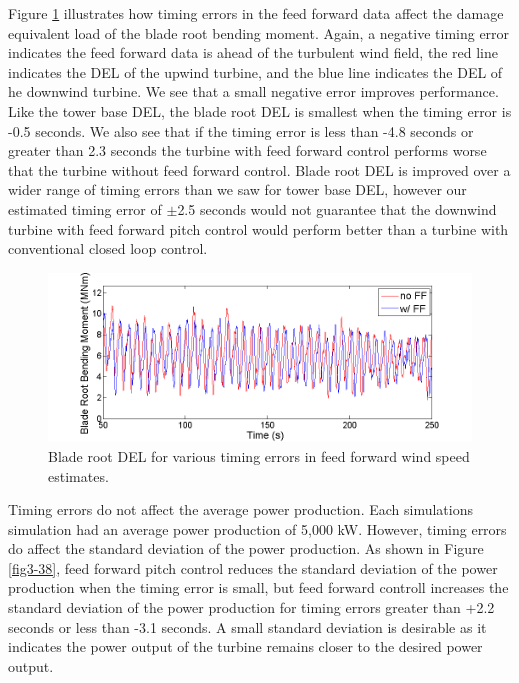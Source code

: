 Figure \ref{fig3-37} illustrates how timing errors in the feed forward data affect the damage equivalent load of the blade root bending moment. Again, a negative timing error indicates the feed forward data is ahead of the turbulent wind field, the red line indicates the DEL of the upwind turbine, and the blue line indicates the DEL of he downwind turbine. We see that a small negative error improves performance. Like the tower base DEL, the blade root DEL is smallest when the timing error is -0.5 seconds. We also see that if the timing error is less than -4.8 seconds or greater than 2.3 seconds the turbine with feed forward control performs worse that the turbine without feed forward control. Blade root DEL is improved over a wider range of timing errors than we saw for tower base DEL, however our estimated timing error of $\pm$2.5 seconds would not guarantee that the downwind turbine with feed forward pitch control would perform better than a turbine with conventional closed loop control.


\begin{figure}[htbp]
	\centering
		\includegraphics[trim = {1cm 0 2cm 0}, clip, width = \linewidth]{Figures/ch3Figures/fig3-35.png}
		
	\caption{Blade root DEL for various timing errors in feed forward wind speed estimates.}
	\label{fig3-37}
\end{figure}

Timing errors do not affect the average power production. Each simulations simulation had an average power production of 5,000 kW. However, timing errors do affect the standard deviation of the power production. As shown in Figure \ref{fig3-38}, feed forward pitch control reduces the standard deviation of the power production when the timing error is small, but feed forward controll increases the standard deviation of the power production for timing errors greater than +2.2 seconds or less than -3.1 seconds. A small standard deviation is desirable as it indicates the power output of the turbine remains closer to the desired power output.

